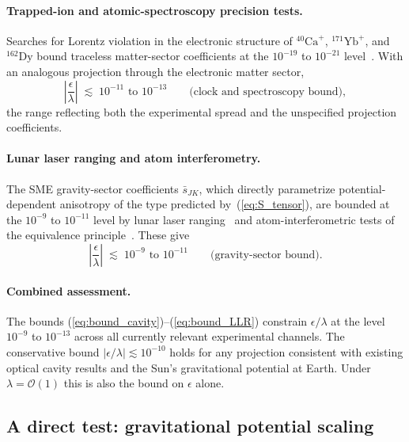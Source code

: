 \documentclass[pdflatex,sn-mathphys-num]{sn-jnl}%
\theoremstyle{thmstyleone}%
\theoremstyle{thmstyletwo}%
\theoremstyle{thmstylethree}%
\begin{document}
\paragraph{Trapped-ion and atomic-spectroscopy precision tests.}
Searches for Lorentz violation in the electronic structure of
$^{40}\mathrm{Ca}^{+}$, $^{171}\mathrm{Yb}^{+}$, and
$^{162}\mathrm{Dy}$ bound traceless matter-sector coefficients
at the $10^{-19}$ to $10^{-21}$
level~\cite{Pruttivarasin2015,Sanner2019,Hohensee2013,
Lange2021}. With an analogous projection through the
electronic matter sector,
\begin{equation}
    \left|\frac{\epsilon}{\lambda}\right|
    \;\lesssim\;10^{-11}\text{ to }10^{-13}
    \qquad\text{(clock and spectroscopy bound)},
    \label{eq:bound_clock}
\end{equation}
the range reflecting both the experimental spread and the
unspecified projection coefficients.

\paragraph{Lunar laser ranging and atom interferometry.}
The SME gravity-sector coefficients $\bar{s}_{JK}$, which
directly parametrize potential-dependent anisotropy of the
type predicted by~(\ref{eq:S_tensor}), are bounded at the
$10^{-9}$ to $10^{-11}$ level by lunar laser
ranging~\cite{Battat2007} and atom-interferometric tests of
the equivalence principle~\cite{MullerChu2010}. These give
\begin{equation}
    \left|\frac{\epsilon}{\lambda}\right|
    \;\lesssim\;10^{-9}\text{ to }10^{-11}
    \qquad\text{(gravity-sector bound)}.
    \label{eq:bound_LLR}
\end{equation}

\paragraph{Combined assessment.}
The bounds (\ref{eq:bound_cavity})--(\ref{eq:bound_LLR})
constrain $\epsilon/\lambda$ at the level $10^{-9}$ to
$10^{-13}$ across all currently relevant experimental
channels. The conservative bound
$|\epsilon/\lambda|\lesssim 10^{-10}$ holds for any projection
consistent with existing optical cavity results and the Sun's
gravitational potential at Earth. Under
$\lambda=\mathcal{O}(1)$ this is also the bound on $\epsilon$
alone.

\subsection{A direct test: gravitational potential scaling}
\label{sec:scaling_test}
\end{document}
